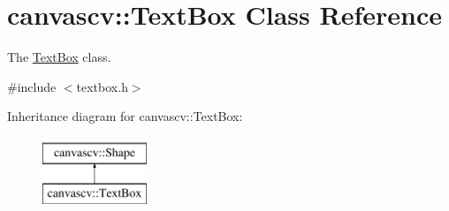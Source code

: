 \hypertarget{classcanvascv_1_1TextBox}{}\section{canvascv\+:\+:Text\+Box Class Reference}
\label{classcanvascv_1_1TextBox}


The \hyperlink{classcanvascv_1_1TextBox}{Text\+Box} class.  




{\ttfamily \#include $<$textbox.\+h$>$}

Inheritance diagram for canvascv\+:\+:Text\+Box\+:\begin{figure}[H]
\begin{center}
\leavevmode
\includegraphics[height=2.000000cm]{classcanvascv_1_1TextBox}
\end{center}
\end{figure}
